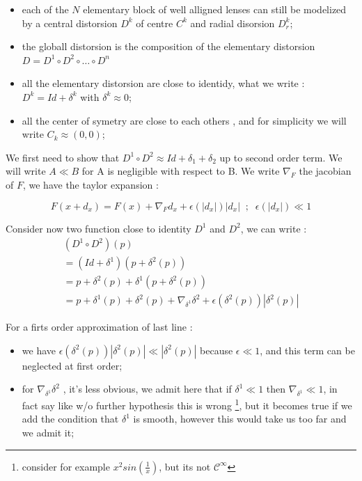 \begin{itemize}
    \item  each of the $N$ elementary block of well alligned lenses can still be 
           modelized by a central distorsion $D^k$ of centre $C^k$ and radial
           disorsion $D^k_r$;

    \item  the globall distorsion is the composition of the elementary distorsion
           $ D = D^1 \circ D^2 \circ \dots \circ D^n$

    \item  all the elementary distorsion are close to identidy, what we write :
           $D^k = Id + \delta^k$  with $\delta^k \approx 0$;

    \item  all the center of symetry are close to each others , and for simplicity
           we will write $C_k \approx (0,0)$;
\end{itemize}


We first need to show that $D^1 \circ D^2  \approx Id + \delta_1 + \delta_2$ up to second order term.
We will write $A\ll B$ for A is negligible with respect to B. We write $\nabla_F$
the jacobian of $F$, we have the taylor expansion :

\begin{equation}
	F(x+d_x) = F(x) + \nabla_F d_x + \epsilon(|d_x|) |d_x|  \;\; ; \;\;  \epsilon(|d_x|) \ll 1
\end{equation}


Consider now two function close to identity $D^1$ and $D^2$, we can write :
\begin{equation}
\begin{multlined}
(D^1 \circ D^2)(p)  \\
=  (Id+\delta^1)(p+\delta^2(p))\\
=  p +\delta^2(p) + \delta^1(p+\delta^2(p)) \\
=  p +\delta^1(p) + \delta^2(p) + \nabla_{\delta^1} \delta^2   + \epsilon(\delta^2(p)) |\delta^2(p)|
\end{multlined}
\end{equation}

For a firts order approximation of last line :

\begin{itemize}
   \item we have $\epsilon(\delta^2(p)) |\delta^2(p)|  \ll |\delta^2(p)|$ because $\epsilon\ll 1$,
          and this term can be neglected at first order;

   \item  for  $ \nabla_{\delta^1} \delta^2$ , it's less obvious, we admit here that
          if $\delta^1 \ll 1$ then $ \nabla_{\delta^1} \ll 1$,  in fact say like w/o further hypothesis this
		is wrong \footnote{consider for example $x^2 sin(\frac{1}{x})$, but its not $\mathcal{C}^\infty$}, but it becomes
          true if we add the condition that $\delta^1$ is smooth, however this would take us too far  and we admit it;
\end{itemize}

